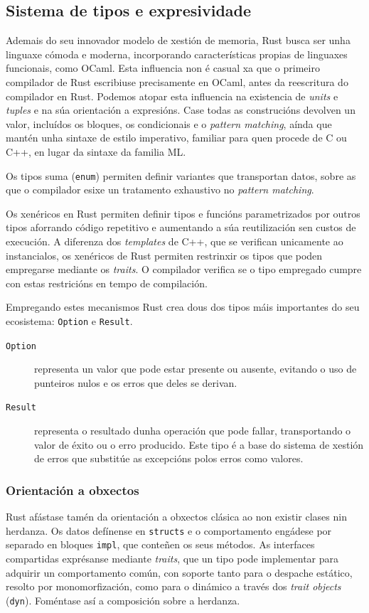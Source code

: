 \subsection{Sistema de tipos e expresividade}
Ademais do seu innovador modelo de xestión de memoria, Rust busca ser unha linguaxe cómoda e moderna,
incorporando características propias de linguaxes funcionais, como OCaml.
Esta influencia non é casual xa que o primeiro compilador de Rust escribiuse precisamente en OCaml,
antes da reescritura do compilador en Rust.
Podemos atopar esta influencia na existencia de \textit{units} e \textit{tuples}
e na súa orientación a expresións.
Case todas as construcións devolven un valor,
incluídos os bloques, os condicionais e o \textit{pattern matching},
aínda que mantén unha sintaxe de estilo imperativo, familiar para quen procede de C ou C++,
en lugar da sintaxe da familia ML.

Os tipos suma (\texttt{enum}) permiten definir variantes que transportan datos,
sobre as que o compilador esixe un tratamento exhaustivo no \textit{pattern matching}.

Os xenéricos en Rust permiten definir tipos e funcións parametrizados por outros tipos
aforrando código repetitivo e aumentando a súa reutilización sen custos de execución.
A diferenza dos \textit{templates} de C++, que se verifican unicamente ao instancialos,
os xenéricos de Rust permiten restrinxir os tipos que poden empregarse mediante os \textit{traits}.
O compilador verifica se o tipo empregado cumpre con estas restricións en tempo de compilación.

Empregando estes mecanismos Rust crea dous dos tipos máis importantes do seu ecosistema: \texttt{Option} e \texttt{Result}.

\begin{description}
  \item[\texttt{Option}] representa un valor que pode estar presente ou ausente,
  evitando o uso de punteiros nulos e os erros que deles se derivan.

  \item[\texttt{Result}] representa o resultado dunha operación que pode fallar,
  transportando o valor de éxito ou o erro producido. Este tipo é a base do sistema de xestión de erros
  que substitúe as excepcións polos erros como valores.
\end{description}


\subsubsection{Orientación a obxectos}
Rust afástase tamén da orientación a obxectos clásica ao non existir clases nin herdanza.
Os datos defínense en \texttt{structs} e o comportamento engádese por separado
en bloques \texttt{impl}, que conteñen os seus métodos.
As interfaces compartidas exprésanse mediante \textit{traits},
que un tipo pode implementar para adquirir un comportamento común,
con soporte tanto para o despache estático, resolto por monomorfización,
como para o dinámico a través dos \textit{trait objects} (\texttt{dyn}).
Foméntase así a composición sobre a herdanza.

